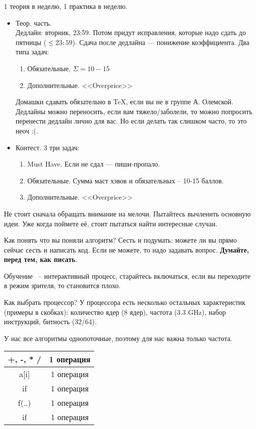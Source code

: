 1 теория в неделю, 1 практика в неделю. \\
\begin{itemize}
    \item Теор. часть. \\ 
        Дедлайн: вторник, 23:59. Потом придут исправления, которые надо сдать до пятницы ($\le 23:59$). Сдача после дедлайна --- понижение коэффициента. Два типа задач:
        \begin{enumerate}
            \item Обязательные, $\Sigma =10-15$
            \item Дополнительные. <<Overprice>>
        \end{enumerate}
        Домашки сдавать обязательно в \TeX, если вы не в группе А. Олемской. Дедлайны можно переносить, если вам тяжело/заболели, то можно попросить перенести дедлайн лично для вас. Но если делать так слишком часто, то это неоч :(.
    \item Контест. 3 три задач:
        \begin{enumerate}
            \item Must Have. Если не сдал --- пиши-пропало.
            \item Обязательные. Сумма маст хэвов и обязательных -- 10-15 баллов.
            \item Дополнительные. <<Overprice>>
        \end{enumerate}
\end{itemize}

Не стоит сначала обращать внимание на мелочи. Пытайтесь вычленить основную идеи. Уже когда поймете её, стоит пытаться найти интересные случаи. 

Как понять что вы поняли алгоритм? Сесть и подумать: можете ли вы прямо сейчас сесть и написать код. Если не можете, то надо задавать вопрос. \textbf{Думайте, перед тем, как писать}.

Обучение ~-- интерактивный процесс, старайтесь включаться, если вы переходите в режим зрителя, то становится плохо.


Как выбрать процессор? У процессора есть несколько остальных характеристик (примеры в скобках): количество ядер (8 ядер), частота (3.3 GHz), набор инструкций, битность (32/64). 

У нас все алгоритмы однопоточные, поэтому для нас важна только частота.

\begin{tabular}{c | c}
    +, -, * / & 1 операция \\ \hline
    a[i] & 1 операция \\ \hline
    if & 1 операция \\ \hline
    f(..) & 1 операция \\ \hline
    if & 1 операция
\end{tabular}

